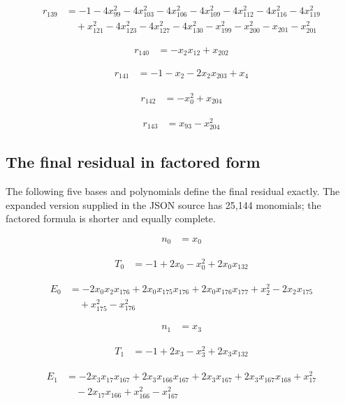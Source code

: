 \begin{align*}
r_{139}&=-1-4x_{99}^{2}-4x_{103}^{2}-4x_{106}^{2}-4x_{109}^{2}-4x_{112}^{2}-4x_{116}^{2}-4x_{119}^{2}\\
&\quad +x_{121}^{2}-4x_{123}^{2}-4x_{127}^{2}-4x_{130}^{2}-x_{199}^{2}-x_{200}^{2}-x_{201}-x_{201}^{2}
\end{align*}

\begin{align*}
r_{140}&=-x_{2}x_{12}+x_{202}
\end{align*}

\begin{align*}
r_{141}&=-1-x_{2}-2x_{2}x_{203}+x_{4}
\end{align*}

\begin{align*}
r_{142}&=-x_{0}^{2}+x_{204}
\end{align*}

\begin{align*}
r_{143}&=x_{93}-x_{204}^{2}
\end{align*}

\subsection{The final residual in factored form}
The following five bases and polynomials define the final residual exactly.
The expanded version supplied in the JSON source has 25,144 monomials; the
factored formula is shorter and equally complete.


\begin{align*}
n_{0}&=x_{0}
\end{align*}

\begin{align*}
T_{0}&=-1+2x_{0}-x_{0}^{2}+2x_{0}x_{132}
\end{align*}

\begin{align*}
E_{0}&=-2x_{0}x_{2}x_{176}+2x_{0}x_{175}x_{176}+2x_{0}x_{176}x_{177}+x_{2}^{2}-2x_{2}x_{175}\\
&\quad +x_{175}^{2}-x_{176}^{2}
\end{align*}

\begin{align*}
n_{1}&=x_{3}
\end{align*}

\begin{align*}
T_{1}&=-1+2x_{3}-x_{3}^{2}+2x_{3}x_{132}
\end{align*}

\begin{align*}
E_{1}&=-2x_{3}x_{17}x_{167}+2x_{3}x_{166}x_{167}+2x_{3}x_{167}+2x_{3}x_{167}x_{168}+x_{17}^{2}\\
&\quad -2x_{17}x_{166}+x_{166}^{2}-x_{167}^{2}
\end{align*}

